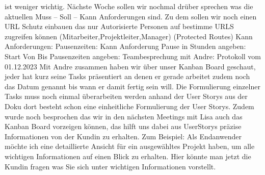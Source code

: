 \documentclass{article}
\begin{document}
ist weniger wichtig. Nächste Woche sollen wir nochmal drüber sprechen was die
aktuellen Muss – Soll – Kann Anforderungen sind. Zu dem sollen wir noch einen
URL Schutz einbauen das nur Autorisierte Personen auf bestimme URLS zugreifen
können (Mitarbeiter,Projektleiter,Manager) (Protected Routes) Kann
Anforderungen: Pausenzeiten: Kann Anforderung Pause in Stunden angeben: Start
Von Bis Pausenzeiten angeben: Teambesprechung mit Andre: Protokoll vom
01.12.2023 Mit Andre zusammen haben wir über unser Kanban Board geschaut, jeder
hat kurz seine Tasks präsentiert an denen er gerade arbeitet zudem noch das
Datum genannt bis wann er damit fertig sein will. Die Formulierung einzelner
Tasks muss noch einmal überarbeiten werden anhand der User Storys aus der Doku
dort besteht schon eine einheitliche Formulierung der User Storys. Zudem wurde
noch besprochen das wir in den nächsten Meetings mit Lisa auch das Kanban Board
vorzeigen können, das hilft uns dabei aus UserStorys präzise Informationen von
der Kundin zu erhalten. Zum Beispiel: Als Endanwender möchte ich eine
detaillierte Ansicht für ein ausgewähltes Projekt haben, um alle wichtigen
Informationen auf einen Blick zu erhalten. Hier könnte man jetzt die Kundin
fragen was Sie sich unter wichtigen Informationen vorstellt.



\end{document}
